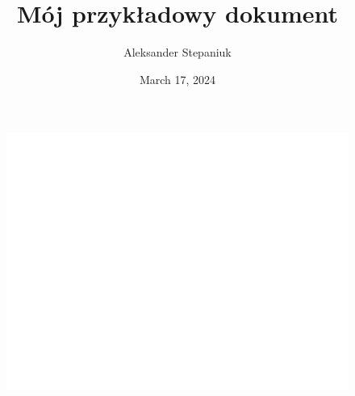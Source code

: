 \documentclass{article}
\title{Mój przykładowy dokument}
\author{Aleksander Stepaniuk}
\date{March 17, 2024}
\begin{document}
\begin{figure}[h!]
    \centering
    \includegraphics[width=0.5\linewidth]{wykres_odpowiedz.png}
    \label{fig:enter-label}
\end{figure}
\end{document}
